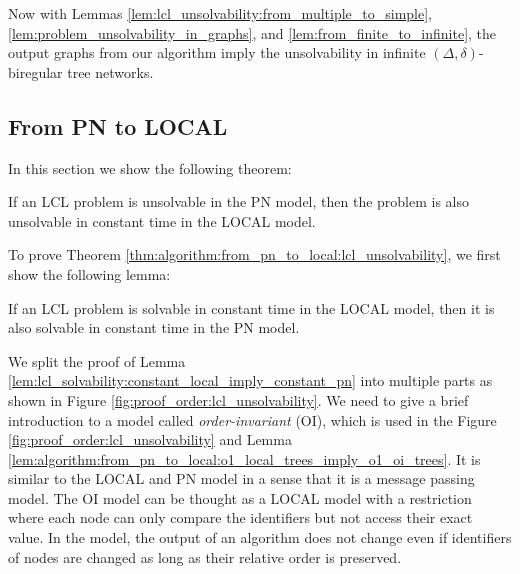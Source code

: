 Now with Lemmas \ref{lem:lcl_unsolvability:from_multiple_to_simple}, \ref{lem:problem_unsolvability_in_graphs}, and \ref{lem:from_finite_to_infinite}, the output graphs from our algorithm imply the unsolvability in infinite $(\Delta, \delta)$-biregular tree networks.

\subsection{From PN to LOCAL} \label{sec:algorithm:from_pn_to_local}

In this section we show the following theorem:
\begin{theorem} \label{thm:algorithm:from_pn_to_local:lcl_unsolvability}
    If an LCL problem is unsolvable in the PN model, then the problem is also unsolvable in constant time in the LOCAL model.
\end{theorem}

To prove Theorem \ref{thm:algorithm:from_pn_to_local:lcl_unsolvability}, we first show the following lemma:
\begin{lemma} \label{lem:lcl_solvability:constant_local_imply_constant_pn}
    If an LCL problem is solvable in constant time in the LOCAL model, then it is also solvable in constant time in the PN model.
\end{lemma}


We split the proof of Lemma \ref{lem:lcl_solvability:constant_local_imply_constant_pn} into multiple parts as shown in Figure \ref{fig:proof_order:lcl_unsolvability}.
We need to give a brief introduction to a model called \emph{order-invariant} (OI), which is used in the Figure \ref{fig:proof_order:lcl_unsolvability} and Lemma \ref{lem:algorithm:from_pn_to_local:o1_local_trees_imply_o1_oi_trees}.
It is similar to the LOCAL and PN model in a sense that it is a message passing model.
The OI model can be thought as a LOCAL model with a restriction where each node can only compare the identifiers but not access their exact value.
In the model, the output of an algorithm does not change even if identifiers of nodes are changed as long as their relative order is preserved.

